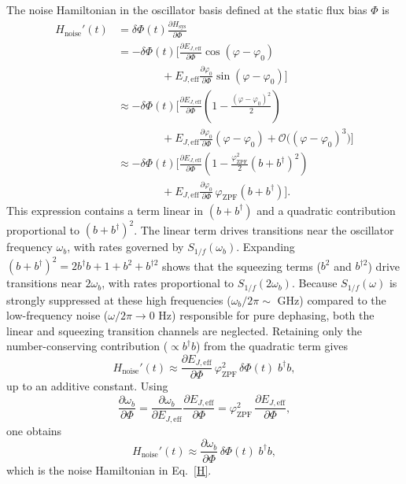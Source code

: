 The noise Hamiltonian in the oscillator basis defined at the static flux bias \(\Phi\) is
\begin{equation}
\begin{aligned}
H_{\text{noise}}'(t) &= \delta\Phi(t) \frac{\partial H_{\text{sys}}}{\partial \Phi} \\
&= -\delta\Phi(t)\biggl[ 
\frac{\partial E_{J,\mathrm{eff}}}{\partial\Phi} \cos(\varphi - \varphi_0) \\
&\qquad\qquad + E_{J,\mathrm{eff}} \frac{\partial \varphi_0}{\partial\Phi} \sin(\varphi - \varphi_0) 
\biggr] \\
&\approx -\delta\Phi(t)\biggl[
\frac{\partial E_{J,\mathrm{eff}}}{\partial\Phi}
\left(1-\frac{(\varphi-\varphi_0)^2}{2}\right) \\
&\qquad\qquad + E_{J,\mathrm{eff}}\frac{\partial \varphi_0}{\partial\Phi}(\varphi-\varphi_0)
+ \mathcal{O}\big((\varphi-\varphi_0)^3\big)
\biggr] \\
&\approx -\delta\Phi(t)\biggl[
\frac{\partial E_{J,\mathrm{eff}}}{\partial\Phi}
\left(1-\frac{\varphi_{\mathrm{ZPF}}^2}{2}(b+b^\dagger)^2\right) \\
&\qquad\qquad + E_{J,\mathrm{eff}}\frac{\partial \varphi_0}{\partial\Phi}\,
\varphi_{\mathrm{ZPF}}(b+b^\dagger)
\biggr].
\end{aligned}
\end{equation}
This expression contains a term linear in \((b+b^\dagger)\) and a quadratic contribution proportional to \((b+b^\dagger)^2\). The linear term drives transitions near the oscillator frequency \(\omega_b\), with rates governed by \(S_{1/f}(\omega_b)\). Expanding \((b+b^\dagger)^2 = 2b^\dagger b + 1 + b^2 + b^{\dagger 2}\) shows that the squeezing terms (\(b^2\) and \(b^{\dagger 2}\)) drive transitions near \(2\omega_b\), with rates proportional to \(S_{1/f}(2\omega_b)\). Because \(S_{1/f}(\omega)\) is strongly suppressed at these high frequencies (\(\omega_b/2\pi\sim\) GHz) compared to the low-frequency noise (\(\omega/2\pi \rightarrow 0\) Hz) responsible for pure dephasing, both the linear and squeezing transition channels are neglected. Retaining only the number-conserving contribution (\(\propto b^\dagger b\)) from the quadratic term gives
\begin{equation}
H_{\text{noise}}'(t)\approx
\frac{\partial E_{J,\mathrm{eff}}}{\partial\Phi}\,\varphi_{\mathrm{ZPF}}^2\,
\delta\Phi(t)\; b^\dagger b ,
\end{equation}
up to an additive constant. Using
\begin{equation}
\frac{\partial\omega_b}{\partial\Phi}
=
\frac{\partial\omega_b}{\partial E_{J,\mathrm{eff}}}\frac{\partial E_{J,\mathrm{eff}}}{\partial\Phi}
=
\varphi_{\mathrm{ZPF}}^2\,\frac{\partial E_{J,\mathrm{eff}}}{\partial\Phi},
\label{eq:sensitivity_deriv}
\end{equation}
one obtains
\begin{equation}
H_{\text{noise}}'(t)\approx
\frac{\partial\omega_b}{\partial\Phi}\,\delta\Phi(t)\; b^\dagger b,
\end{equation}
which is the noise Hamiltonian in Eq.~\eqref{H}.